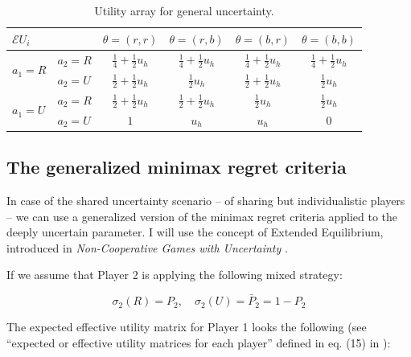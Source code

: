 \documentclass{article}
\theoremstyle{definition}
\begin{document}
\begin{table}[H]
\begin{center}
\renewcommand{\arraystretch}{1.3} %
\begin{tabular}{|l l|c c c c|}
\hline
\multirow{1}{*}{$\mathcal{E}U_i$} & & $\theta=(r,r)$ & $\theta=(r,b)$ & $\theta=(b,r)$ & $\theta=(b,b)$\\
\hline
\multirow{2}{*}{$a_1=R$}
  & $a_2=R$ &
  $\frac{1}{4} +  \frac{1}{2} u_h$ & 
  $\frac{1}{4} +  \frac{1}{2} u_h$ & 
  $\frac{1}{4} +  \frac{1}{2} u_h$ & 
  $\frac{1}{4} +  \frac{1}{2} u_h$\\
\cline{2-6}
  & $a_2=U$ &
  $\frac{1}{2} + \frac{1}{2} u_h$ & 
  $\frac{1}{2} u_h$ & 
  $\frac{1}{2} + \frac{1}{2} u_h$ & 
  $\frac{1}{2} u_h$\\
\hline
\multirow{2}{*}{$a_1=U$}
  & $a_2=R$ &
  $\frac{1}{2} + \frac{1}{2} u_h$ & 
  $\frac{1}{2} + \frac{1}{2} u_h$ & 
  $\frac{1}{2} u_h$ & 
  $\frac{1}{2} u_h$\\
\cline{2-6}
  & $a_2=U$ &
  $1$ & 
  $u_h$ & 
  $u_h$ & 
  $0$\\
\hline
\end{tabular}
\caption{Utility array for general uncertainty.}
    \label{tab:UtilitySharedIdentity}
\end{center}
\end{table}


\subsection{The generalized minimax regret criteria}

In case of the shared uncertainty scenario -- of sharing but individualistic players -- we can use a generalized version of the minimax regret criteria applied to the deeply uncertain parameter.
I will use the concept of Extended Equilibrium, introduced in \emph{Non-Cooperative Games with Uncertainty} \cite{arxiv:ExtendedEquilibrium}.

If we assume that Player 2 is applying the following mixed strategy:

\begin{equation}
    \sigma_2(R) = P_2, \quad \sigma_2(U) = \bar{P}_2 = 1-P_2
\end{equation}

The expected effective utility matrix for Player 1 looks the following (see ``expected or effective utility matrices for each player'' defined in eq. (15) in \cite{arxiv:ExtendedEquilibrium}):
\end{document}
